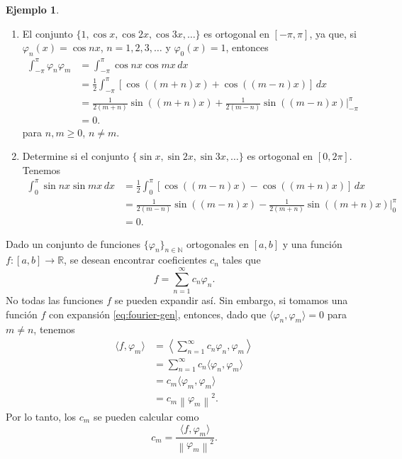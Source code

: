 \documentclass[11pt,letterpaper,draft]{report}
\theoremstyle{plain}
\theoremstyle{definition}
\newtheorem{example}[theorem]{Ejemplo}
\theoremstyle{remark}
\newcommand\R{\mathbb R}
\newcommand\N{\mathbb N}
\newcommand\norm[1]{\left\|#1\right\|}
\newcommand\<{\langle}
\renewcommand\>{\rangle}
\renewcommand\phi\varphi
\begin{document}
\begin{example}
  \begin{enumerate}
    \item   
    El conjunto $\{1,\cos x,\cos 2x,\cos 3x,\dots\}$ es ortogonal
    en $[-\pi,\pi]$, ya que, si $\phi_n(x)=\cos nx$,
    $n=1,2,3,\dots$ y $\phi_0(x)=1$, entonces
    \begin{align*}
      \int_{-\pi}^\pi \phi_n\phi_m
      &= \int_{-\pi}^\pi \cos nx \cos mx \,dx \\
      &= \frac{1}{2}
        \int_{-\pi}^\pi [\cos((m+n)x) + \cos((m-n)x)] \,dx \\
      &= \frac{1}{2(m+n)}\sin((m+n)x) + \frac{1}{2(m-n)}\sin((m-n)x)
      |_{-\pi}^\pi \\
      &= 0.
    \end{align*}
    para $n,m\geq 0$, $n\neq m$.

    \item Determine si el conjunto $\{\sin x,\sin 2x,\sin
    3x,\dots\}$ es ortogonal en $[0,2\pi]$.
    Tenemos
    \begin{align*}
      \int_0^\pi \sin nx\sin mx \,dx
      &= \frac{1}{2}\int_0^\pi[\cos((m-n)x)-\cos((m+n)x)] \,dx \\
      &= \frac{1}{2(m-n)}\sin((m-n)x)
        - \frac{1}{2(m+n)}\sin((m+n)x) |_0^\pi \\
      &= 0.
    \end{align*}
  \end{enumerate}
\end{example}

Dado un conjunto de funciones $\{\phi_n\}_{n\in\N}$ ortogonales en
$[a,b]$ y una función $f:[a,b]\to\R$,
se desean encontrar coeficientes $c_n$ tales que
\begin{equation}\label{eq:fourier-gen}
  f = \sum_{n=1}^{\infty}c_n\phi_n.
\end{equation}
No todas las funciones $f$ se pueden expandir así.
Sin embargo, si tomamos una función $f$ con expansión
\eqref{eq:fourier-gen}, entonces,
dado que $\<\phi_n,\phi_m\>=0$ para $m\neq n$, tenemos
\begin{align*}
  \<f,\phi_m\>
  &= \left\< \sum_{n=1}^{\infty}c_n\phi_n,\phi_m\right\> \\
  &= \sum_{n=1}^{\infty}c_n\<\phi_n,\phi_m\> \\
  &= c_m\<\phi_m,\phi_m\> \\
  &= c_m\norm{\phi_m}^{2}.
\end{align*}
Por lo tanto, los $c_m$ se pueden calcular como
\[
  c_m = \frac{\<f,\phi_m\>}{\norm{\phi_m}^2}
.\]
\end{document}
